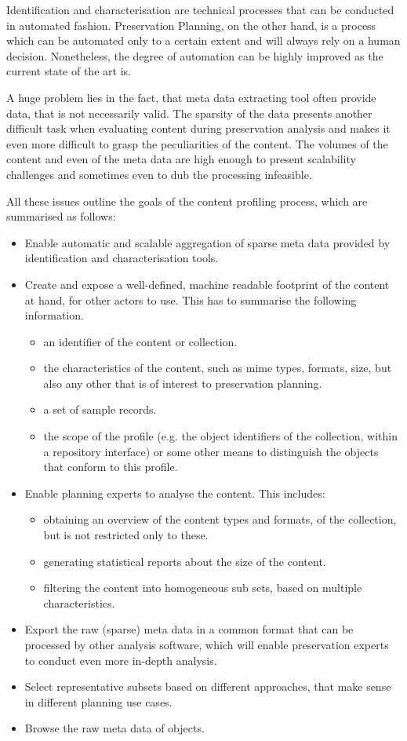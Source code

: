 Identification and characterisation are technical processes that can be conducted in automated fashion. Preservation Planning, on the other hand, is a process which can be automated only to a certain extent and will always rely on a human decision. Nonetheless, the degree of automation can be highly improved as the current state of the art is. 

A huge problem lies in the fact, that meta data extracting tool often provide data, that is not necessarily valid. The sparsity of the data presents another difficult task when evaluating content during preservation analysis and makes it even more difficult to grasp the peculiarities of the content. The volumes of the content and even of the meta data are high enough to present scalability challenges and sometimes even to dub the processing infeasible.

All these issues outline the goals of the content profiling process, which are summarised as follows:

\begin{itemize}
\item Enable automatic and scalable aggregation of sparse meta data provided by identification and characterisation tools.
\item Create and expose a well-defined, machine readable footprint of the content at hand, for other actors to use. This has to summarise the following information.
 \begin{itemize}
  \item an identifier of the content or collection.
  \item the characteristics of the content, such as mime types, formats, size, but also any other that is of interest to preservation planning.
  \item a set of sample records.
  \item the scope of the profile (e.g. the object identifiers of the collection, within a repository interface) or some other means to distinguish the objects that conform to this profile.
 \end{itemize}
\item Enable planning experts to analyse the content. This includes:
 \begin{itemize}
  \item obtaining an overview of the content types and formats, of the collection, but is not restricted only to these.
  \item generating statistical reports about the size of the content.
  \item filtering the content into homogeneous sub sets, based on multiple characteristics.
 \end{itemize}
\item Export the raw (sparse) meta data in a common format that can be processed by other analysis software, which will enable preservation experts to conduct even more in-depth analysis.
\item Select representative subsets based on different approaches, that make sense in different planning use cases.
\item Browse the raw meta data of objects.
\end{itemize}

